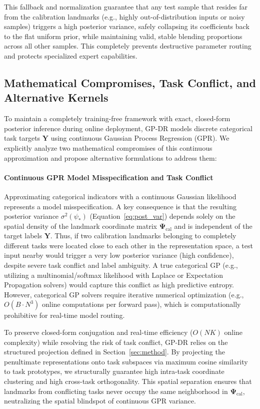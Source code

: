 This fallback and normalization guarantee that any test sample that resides far from the calibration landmarks (e.g., highly out-of-distribution inputs or noisy samples) triggers a high posterior variance, safely collapsing its coefficients back to the flat uniform prior, while maintaining valid, stable blending proportions across all other samples. This completely prevents destructive parameter routing and protects specialized expert capabilities.

\subsection{Mathematical Compromises, Task Conflict, and Alternative Kernels}
To maintain a completely training-free framework with exact, closed-form posterior inference during online deployment, GP-DR models discrete categorical task targets $\mathbf{Y}$ using continuous Gaussian Process Regression (GPR). We explicitly analyze two mathematical compromises of this continuous approximation and propose alternative formulations to address them:

\paragraph{Continuous GPR Model Misspecification and Task Conflict}
Approximating categorical indicators with a continuous Gaussian likelihood represents a model misspecification. A key consequence is that the resulting posterior variance $\sigma^2(\psi_*)$ (Equation~\ref{eq:post_var}) depends solely on the spatial density of the landmark coordinate matrix $\mathbf{\Psi}_{\text{cal}}$ and is independent of the target labels $\mathbf{Y}$. Thus, if two calibration landmarks belonging to completely different tasks were located close to each other in the representation space, a test input nearby would trigger a very low posterior variance (high confidence), despite severe task conflict and label ambiguity. A true categorical GP (e.g., utilizing a multinomial/softmax likelihood with Laplace or Expectation Propagation solvers) would capture this conflict as high predictive entropy. However, categorical GP solvers require iterative numerical optimization (e.g., $O(B \cdot N^3)$ online computations per forward pass), which is computationally prohibitive for real-time model routing. 

To preserve closed-form conjugation and real-time efficiency ($O(NK)$ online complexity) while resolving the risk of task conflict, GP-DR relies on the structured projection defined in Section~\ref{sec:method}. By projecting the penultimate representations onto task subspaces via maximum cosine similarity to task prototypes, we structurally guarantee high intra-task coordinate clustering and high cross-task orthogonality. This spatial separation ensures that landmarks from conflicting tasks never occupy the same neighborhood in $\mathbf{\Psi}_{\text{cal}}$, neutralizing the spatial blindspot of continuous GPR variance.

